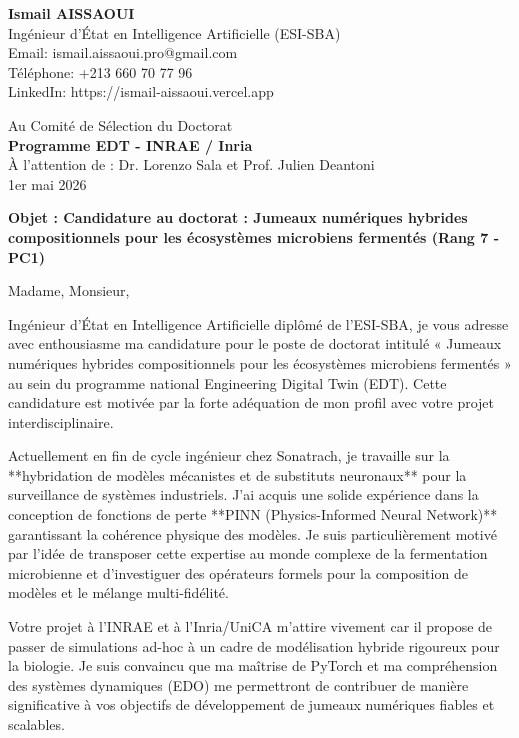 \documentclass[11pt,a4paper]{article}
\begin{document}
\noindent \textbf{Ismail AISSAOUI} \\
Ingénieur d'État en Intelligence Artificielle (ESI-SBA) \\
Email: ismail.aissaoui.pro@gmail.com \\
Téléphone: +213 660 70 77 96 \\
LinkedIn: https://ismail-aissaoui.vercel.app

\bigskip

\begin{flushright}
    Au Comité de Sélection du Doctorat \\
    \textbf{Programme EDT - INRAE / Inria} \\
    À l'attention de : Dr. Lorenzo Sala et Prof. Julien Deantoni \\
    \medskip
    1er mai 2026
\end{flushright}

\bigskip

\noindent \textbf{Objet : Candidature au doctorat : Jumeaux numériques hybrides compositionnels pour les écosystèmes microbiens fermentés (Rang 7 - PC1)}

\bigskip

Madame, Monsieur,

Ingénieur d'État en Intelligence Artificielle diplômé de l'ESI-SBA, je vous adresse avec enthousiasme ma candidature pour le poste de doctorat intitulé « Jumeaux numériques hybrides compositionnels pour les écosystèmes microbiens fermentés » au sein du programme national Engineering Digital Twin (EDT). Cette candidature est motivée par la forte adéquation de mon profil avec votre projet interdisciplinaire.

Actuellement en fin de cycle ingénieur chez Sonatrach, je travaille sur la **hybridation de modèles mécanistes et de substituts neuronaux** pour la surveillance de systèmes industriels. J'ai acquis une solide expérience dans la conception de fonctions de perte **PINN (Physics-Informed Neural Network)** garantissant la cohérence physique des modèles. Je suis particulièrement motivé par l'idée de transposer cette expertise au monde complexe de la fermentation microbienne et d'investiguer des opérateurs formels pour la composition de modèles et le mélange multi-fidélité.

Votre projet à l'INRAE et à l'Inria/UniCA m'attire vivement car il propose de passer de simulations ad-hoc à un cadre de modélisation hybride rigoureux pour la biologie. Je suis convaincu que ma maîtrise de PyTorch et ma compréhension des systèmes dynamiques (EDO) me permettront de contribuer de manière significative à vos objectifs de développement de jumeaux numériques fiables et scalables.
\end{document}
